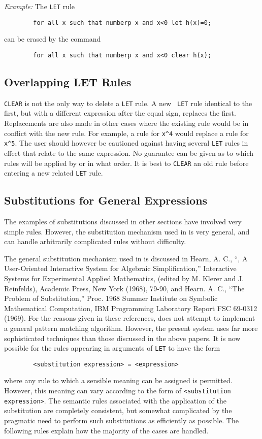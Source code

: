 {\it Example:} The {\tt LET} rule
\begin{verbatim}
        for all x such that numberp x and x<0 let h(x)=0;
\end{verbatim}
can be erased by the command
\begin{verbatim}
        for all x such that numberp x and x<0 clear h(x);
\end{verbatim}

\subsection{Overlapping LET Rules}
{\tt CLEAR} is not the only way to delete a {\tt LET} rule.  A new {\tt
LET} rule identical to the first, but with a different expression after
the equal sign, replaces the first.  Replacements are also made in other
cases where the existing rule would be in conflict with the new rule.  For
example, a rule for {\tt x\verb|^|4} would replace a rule for {\tt x\verb|^|5}.
The user should however be cautioned against having several {\tt LET}
rules in effect that relate to the same expression.  No guarantee can be
given as to which rules will be applied by {\REDUCE} or in what order.  It
is best to {\tt CLEAR} an old rule before entering a new related {\tt LET}
rule.

\subsection{Substitutions for General Expressions}
\label{sec-gensubs}
The examples of substitutions discussed in other sections have involved
very simple rules. However, the substitution mechanism used in {\REDUCE} is
very general, and can handle arbitrarily complicated rules without
difficulty.

The general substitution mechanism used in {\REDUCE} is discussed in Hearn, A.
C., ``{\REDUCE}, A User-Oriented Interactive System for Algebraic
Simplification,'' Interactive Systems for Experimental Applied Mathematics,
(edited by M. Klerer and J. Reinfelds), Academic Press, New York (1968),
79-90, and Hearn. A. C., ``The Problem of Substitution,'' Proc. 1968 Summer
Institute on Symbolic Mathematical Computation, IBM Programming Laboratory
Report FSC 69-0312 (1969). For the reasons given in these
references, {\REDUCE} does not attempt to implement a general pattern
matching algorithm.  However, the present system uses far more sophisticated
techniques than those discussed in the above papers.  It is now possible for
the rules appearing in arguments of {\tt LET} to have the form
\begin{verbatim}
        <substitution expression> = <expression>
\end{verbatim}
where any rule to which a sensible meaning can be assigned is permitted.
However, this meaning can vary according to the form of {\tt <substitution
expression>}. The semantic rules associated with the application of the
substitution are completely consistent, but somewhat complicated by the
pragmatic need to perform such substitutions as efficiently as possible.
The following rules explain how the majority of the cases are handled.

